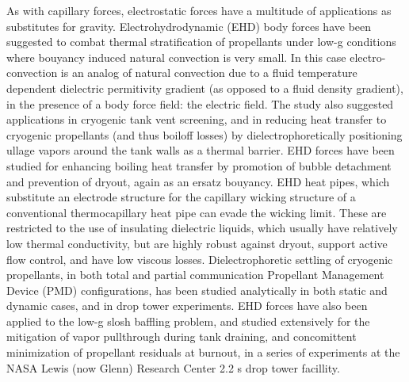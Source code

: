 \documentclass[12pt,a4paper,oneside]{book}
\begin{document}
As with capillary forces, electrostatic forces have a multitude of applications as substitutes for gravity. Electrohydrodynamic (EHD) body forces have been suggested to combat thermal stratification of propellants under low-g conditions where bouyancy induced natural convection is very small\cite{blackmon_collection_1965}. In this case electro-convection is an analog of natural convection due to a fluid temperature dependent dielectric permitivity gradient (as opposed to a fluid density gradient), in the presence of a body force field: the electric field. The study also suggested applications in cryogenic tank vent screening, and in reducing heat transfer to cryogenic propellants (and thus boiloff losses) by dielectrophoretically positioning ullage vapors around the tank walls as a thermal barrier. EHD forces have been studied for enhancing boiling heat transfer by promotion of bubble detachment and prevention of dryout, again as an ersatz bouyancy\cite{snyder_dielectrophoresis_2001, di_marco_influence_2003, marco_use_2012}. EHD heat pipes, which substitute an electrode structure for the capillary wicking structure of a conventional thermocapillary heat pipe can evade the wicking limit\cite{jones_electrohydrodynamic_1973}. These are restricted to the use of insulating dielectric liquids, which usually have relatively low thermal conductivity, but are highly robust against dryout, support active flow control, and have low viscous losses. Dielectrophoretic settling of cryogenic propellants, in both total and partial communication Propellant Management Device (PMD) configurations, has been studied analytically in both static\cite{hurwitz_electrohydrodynamic_1966} and dynamic cases\cite{koval_dynamics_1967}, and in drop tower experiments\cite{fax_dielectrophoretic_1969}. EHD forces have also been applied to the low-g slosh baffling problem\cite{boretz_orbital_1970, petrash_use_1968, hurwitz_dielectrophoretic_1968}, and studied extensively for the mitigation of vapor pullthrough during tank draining, and concomittent minimization of propellant residuals at burnout, in a series of experiments at the NASA Lewis (now Glenn) Research Center 2.2 s drop tower facillity\cite{berenyi_dielectrophoretic_1970}. 
\end{document}
